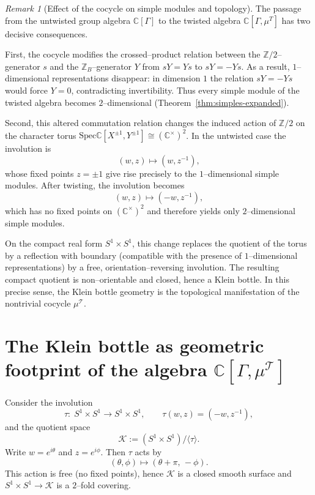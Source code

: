 \documentclass[11pt]{amsart}
\theoremstyle{remark}
\newtheorem{remark}[theorem]{Remark}
\theoremstyle{definition}
\def\Spec{\mathrm{Spec}}
\newcommand{\Z}{\mathbb{Z}}
\newcommand{\C}{\mathbb{C}}
\def\cT{\mathcal{T}}
\def\cK{\mathcal{K}}
\begin{document}
\begin{remark}[Effect of the cocycle on simple modules and topology]\label{rem:twist-comparison}
The passage from the untwisted group algebra $\C[\Gamma]$ to the twisted algebra
$\C[\Gamma,\mu^T]$ has two decisive consequences.

First, the cocycle modifies the crossed--product relation between the $\Z/2$--generator $s$
and the $\Z_B$--generator $Y$ from $sY=Ys$ to $sY=-Ys$.  
As a result, $1$--dimensional representations disappear: in dimension $1$ the relation
$sY=-Ys$ would force $Y=0$, contradicting invertibility.  
Thus every simple module of the twisted algebra becomes $2$--dimensional
(Theorem~\ref{thm:simples-expanded}).

Second, this altered commutation relation changes the induced action of $\Z/2$
on the character torus $\Spec \C[X^{\pm1},Y^{\pm1}] \cong (\C^\times)^2$.
In the untwisted case the involution is
\[
(w,z)\longmapsto (w, z^{-1}),
\]
whose fixed points $z=\pm1$ give rise precisely to the $1$--dimensional simple modules.
After twisting, the involution becomes
\[
(w,z)\longmapsto (-w, z^{-1}),
\]
which has no fixed points on $(\C^\times)^2$ and therefore yields only
$2$--dimensional simple modules.

On the compact real form $S^1\times S^1$, this change replaces the quotient
of the torus by a reflection with boundary (compatible with the presence of
$1$--dimensional representations) by a free, orientation--reversing involution.
The resulting compact quotient is non--orientable and closed, hence a Klein bottle.
In this precise sense, the Klein bottle geometry is the topological manifestation
of the nontrivial cocycle $\mu^\cT$.
\end{remark}




\section{The Klein bottle as geometric footprint of the algebra $\C[\Gamma, \mu^\cT]$}   

Consider the involution
\[
\tau\colon\; S^1\times S^1 \longrightarrow S^1\times S^1,\qquad \tau(w,z)=(-w,z^{-1}),
\]
and the quotient space
\[
\cK := (S^1\times S^1)/\langle \tau\rangle .
\]
Write $w=e^{i\theta}$ and $z=e^{i\phi}$.  Then $\tau$ acts by
\[
(\theta,\phi)\longmapsto (\theta+\pi,\,-\phi).
\]
This action is free (no fixed points), hence $\cK$ is a closed smooth surface and
$S^1\times S^1\to \cK$ is a $2$--fold covering.
\end{document}
